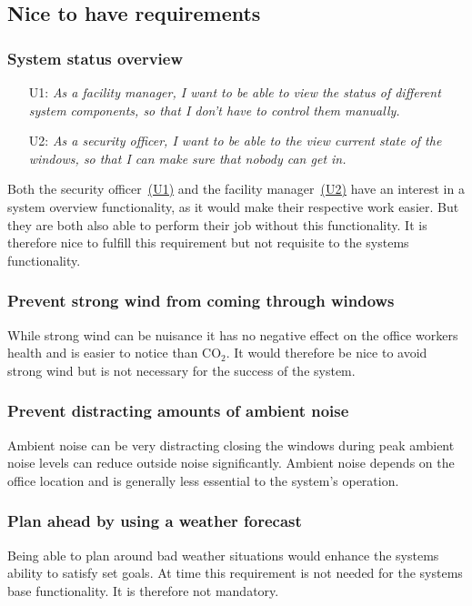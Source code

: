 \documentclass[runningheads]{llncs}
\begin{document}
\subsection{Nice to have requirements}
\subsubsection{System status overview}
\begin{itemize}
    \item [U1:] \label{r6u1} \textit{As a facility manager, I want to be able to view the status of different system components, so that I don't have to control them manually.}
    \item [U2:] \label{r6u2} \textit{As a security officer, I want to be able to the view current state of the windows, so that I can make sure that nobody can get in.}
\end{itemize}
Both the security officer~\hyperref[r6u1]{(U1)} and the facility manager~\hyperref[r6u1]{(U2)} have an interest in a system overview functionality, as it would make their respective work easier. But they are both also able to perform their job without this functionality. It is therefore nice to fulfill this requirement but not requisite to the systems functionality.

\subsubsection{Prevent strong wind from coming through windows}
While strong wind can be nuisance it has no negative effect on the office workers health and is easier to notice than CO$_2$. It would therefore be nice to avoid strong wind but is not necessary for the success of the system. 

\subsubsection{Prevent distracting amounts of ambient noise}
Ambient noise can be very distracting closing the windows during peak ambient noise levels can reduce outside noise significantly. Ambient noise depends on the office location and is generally less essential to the system's operation.

\subsubsection{Plan ahead by using a weather forecast}
Being able to plan around bad weather situations would enhance the systems ability to satisfy set goals. At time this requirement is not needed for the systems base functionality. It is therefore not mandatory.   
\end{document}
